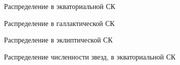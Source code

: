 \documentclass[14pt]{article} %
\begin{document}
\begin{figure}[h!]
\caption{Распределение в экваториальной СК}
\label{img:all_ra}
\end{figure}
\begin{figure}[h!]
\caption{Распределение в галлактической СК}
\label{img:alllv}
\end{figure}
\begin{figure}[h!]
\caption{Распределение в эклиптической СК}
\label{img:alllon}
\end{figure}
\begin{figure}[h!]
\caption{Распределение численности звезд, в экваториальной СК}
\label{img:hixpix500}
\end{figure}
\end{document}

